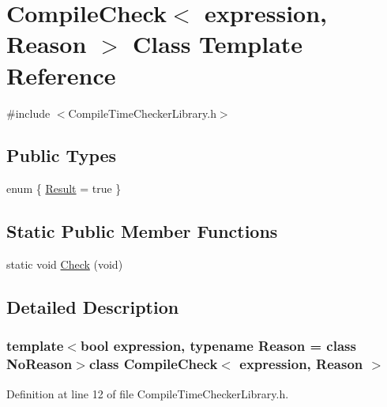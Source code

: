 \hypertarget{class_compile_check}{\section{Compile\-Check$<$ expression, Reason $>$ Class Template Reference}
\label{class_compile_check}
}


{\ttfamily \#include $<$Compile\-Time\-Checker\-Library.\-h$>$}

\subsection*{Public Types}
\begin{DoxyCompactItemize}
\item 
enum \{ \hyperlink{class_compile_check_a23f09425353e49afb718c608ee4e14eeae1aaa6a952694dd245ce18936fb2b758}{Result} = true
 \}
\end{DoxyCompactItemize}
\subsection*{Static Public Member Functions}
\begin{DoxyCompactItemize}
\item 
static void \hyperlink{class_compile_check_a0b48338cd3cb0e57b5d5182a1400f847}{Check} (void)
\end{DoxyCompactItemize}


\subsection{Detailed Description}
\subsubsection*{template$<$bool expression, typename Reason = class No\-Reason$>$class Compile\-Check$<$ expression, Reason $>$}



Definition at line 12 of file Compile\-Time\-Checker\-Library.\-h.



